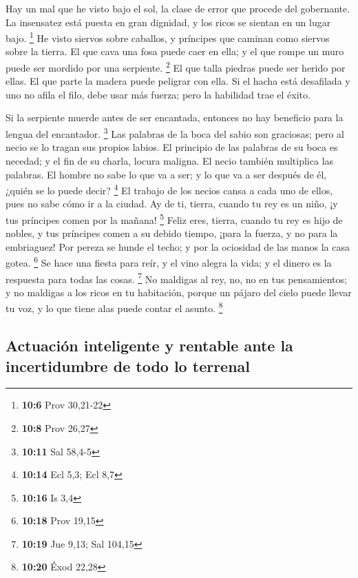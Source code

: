 Hay un mal que he visto bajo el sol, la clase de error
que procede del gobernante.  La insensatez está puesta en
gran dignidad, y los ricos se sientan en un lugar bajo. \footnote{\textbf{10:6}
  Prov 30,21-22}  He visto siervos sobre caballos, y
príncipes que caminan como siervos sobre la tierra.  El
que cava una fosa puede caer en ella; y el que rompe un muro puede ser
mordido por una serpiente. \footnote{\textbf{10:8} Prov 26,27}
 El que talla piedras puede ser herido por ellas. El que
parte la madera puede peligrar con ella.  Si el hacha
está desafilada y uno no afila el filo, debe usar más fuerza; pero la
habilidad trae el éxito.

 Si la serpiente muerde antes de ser encantada, entonces
no hay beneficio para la lengua del encantador. \footnote{\textbf{10:11}
  Sal 58,4-5}  Las palabras de la boca del sabio son
graciosas; pero al necio se lo tragan sus propios labios.
 El principio de las palabras de su boca es necedad; y el
fin de su charla, locura maligna.  El necio también
multiplica las palabras. El hombre no sabe lo que va a ser; y lo que va
a ser después de él, ¿quién se lo puede decir? \footnote{\textbf{10:14}
  Ecl 5,3; Ecl 8,7}  El trabajo de los necios cansa a
cada uno de ellos, pues no sabe cómo ir a la ciudad.  Ay
de ti, tierra, cuando tu rey es un niño, ¡y tus príncipes comen por la
mañana! \footnote{\textbf{10:16} Is 3,4}  Feliz eres,
tierra, cuando tu rey es hijo de nobles, y tus príncipes comen a su
debido tiempo, ¡para la fuerza, y no para la embriaguez! 
Por pereza se hunde el techo; y por la ociosidad de las manos la casa
gotea. \footnote{\textbf{10:18} Prov 19,15}  Se hace una
fiesta para reír, y el vino alegra la vida; y el dinero es la respuesta
para todas las cosas. \footnote{\textbf{10:19} Jue 9,13; Sal 104,15}
 No maldigas al rey, no, no en tus pensamientos; y no
maldigas a los ricos en tu habitación, porque un pájaro del cielo puede
llevar tu voz, y lo que tiene alas puede contar el asunto. \footnote{\textbf{10:20}
  Éxod 22,28}

\hypertarget{actuaciuxf3n-inteligente-y-rentable-ante-la-incertidumbre-de-todo-lo-terrenal}{%
\subsection{Actuación inteligente y rentable ante la incertidumbre de
todo lo
terrenal}\label{actuaciuxf3n-inteligente-y-rentable-ante-la-incertidumbre-de-todo-lo-terrenal}}

